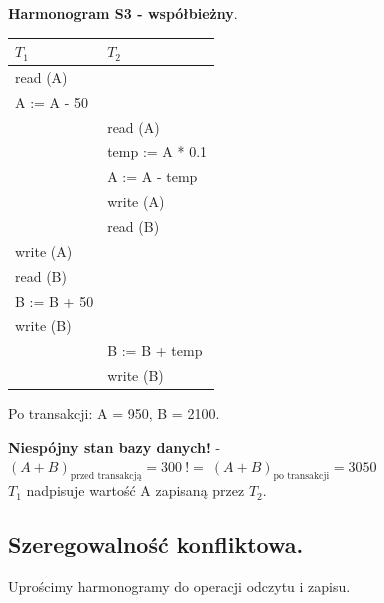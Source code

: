 \documentclass[12pt]{article}
\begin{document}
    \noindent \textbf{Harmonogram S3 - współbieżny}.
    \begin{table}[H]
        \begin{center}
            \begin{tabular}{| p{6cm} | p{6cm} |}
                \hline
                $T_1$ & $T_2$\\
                \hline
                \hline
                read (A) &\\
                \hline
                A := A - 50 &\\
                \hline
                & read (A)\\
                \hline
                & temp := A * 0.1\\
                \hline
                & A := A - temp\\
                \hline
                & write (A)\\
                \hline
                & read (B)\\
                \hline
                write (A) &\\
                \hline
                read (B) &\\
                \hline
                B := B + 50 &\\
                \hline
                write (B) &\\
                \hline
                & B := B + temp\\
                \hline
                & write (B)\\
                \hline
            \end{tabular}
        \end{center}
    \end{table}

    Po transakcji: A = 950, B = 2100.

    \textbf{Niespójny stan bazy danych!} - $( A + B )_{\text{przed transakcją}} = 300 ~ != ~ ( A + B )_{\text{po transakcji}} = 3050$\\
    $T_1$ nadpisuje wartość A zapisaną przez $T_2$.

    \subsection{Szeregowalność konfliktowa.}
    Uprościmy harmonogramy do operacji odczytu i zapisu.\\
\end{document}
